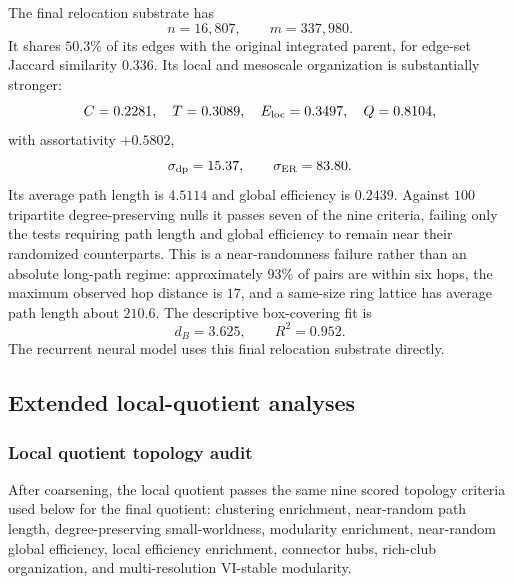 \documentclass[12pt]{article}
\begin{document}
The final relocation substrate has
\[
n=16{,}807,\qquad m=337{,}980.
\]
It shares \(50.3\%\) of its edges with the original integrated parent, for
edge-set Jaccard similarity \(0.336\).  Its local and mesoscale organization
is substantially stronger:
\[
C=0.2281,\quad T=0.3089,\quad E_{\rm loc}=0.3497,
\quad Q=0.8104,
\]
with assortativity \(+0.5802\),
\[
\sigma_{\rm dp}=15.37,\qquad \sigma_{\rm ER}=83.80.
\]
Its average path length is \(4.5114\) and global efficiency is \(0.2439\).
Against \(100\) tripartite degree-preserving nulls it passes seven of the nine
criteria, failing only the tests requiring path length and global efficiency
to remain near their randomized counterparts.  This is a near-randomness
failure rather than an absolute long-path regime: approximately \(93\%\) of
pairs are within six hops, the maximum observed hop distance is \(17\), and a
same-size ring lattice has average path length about \(210.6\).  The
descriptive box-covering fit is
\[
d_B=3.625,\qquad R^2=0.952.
\]
The recurrent neural model uses this final relocation substrate directly.



\subsection{Extended local-quotient analyses}
\label{supp:local-quotient}

\subsubsection{Local quotient topology audit}

After coarsening, the local quotient passes the same nine scored topology
criteria used below for the final quotient: clustering enrichment,
near-random path length, degree-preserving small-worldness, modularity
enrichment, near-random global efficiency, local efficiency enrichment,
connector hubs, rich-club organization, and multi-resolution VI-stable
modularity.
\end{document}
